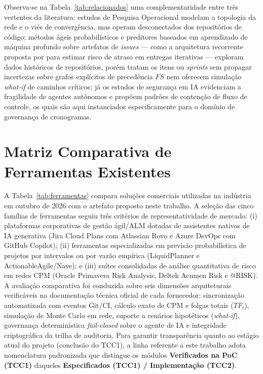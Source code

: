 \documentclass[12pt,openany,oneside,a4paper,english,brazilian,sumario=tradicional]{abntex2}
\begin{document}
Observa-se na Tabela~\ref{tab:relacionados} uma complementaridade entre três vertentes da literatura: estudos de Pesquisa Operacional \cite{clark1961,vanslyke1963,williams1992,hulett2000} modelam a topologia da rede e o viés de convergência, mas operam desconectados dos repositórios de código; métodos ágeis probabilísticos \cite{magennis2011,vacanti2015} e preditores baseados em aprendizado de máquina profundo sobre artefatos de \textit{issues} — como a arquitetura recorrente proposta por  para estimar risco de atraso em entregas iterativas — exploram dados históricos de repositórios, porém tratam os itens ou \textit{sprints} sem propagar incertezas sobre grafos explícitos de precedência $FS$ nem oferecem simulação \textit{what-if} de caminhos críticos; já os estudos de segurança em IA \cite{greshake2023,debenedetti2024,debenedetti2025camel,beurerkellner2025patterns} evidenciam a fragilidade de agentes autônomos e propõem padrões de contenção de fluxo de controle, os quais são aqui instanciados especificamente para o domínio de governança de cronogramas.

\section{Matriz Comparativa de Ferramentas Existentes}

A Tabela~\ref{tab:ferramentas} compara soluções comerciais utilizadas na indústria em outubro de 2026 com o artefato proposto neste trabalho. A seleção das cinco famílias de ferramentas seguiu três critérios de representatividade de mercado: (i) plataformas corporativas de gestão ágil/ALM dotadas de assistentes nativos de IA generativa (Jira Cloud Plans com Atlassian Rovo e Azure DevOps com GitHub Copilot); (ii) ferramentas especializadas em previsão probabilística de projetos por intervalos ou por vazão empírica (LiquidPlanner e ActionableAgile/Nave); e (iii) suítes consolidadas de análise quantitativa de risco em redes CPM (Oracle Primavera Risk Analysis, Deltek Acumen Risk e @RISK). A avaliação comparativa foi conduzida sobre seis dimensões arquiteturais verificáveis na documentação técnica oficial de cada fornecedor: sincronização automatizada com eventos Git/CI, cálculo exato de CPM e folgas totais ($TF_i$), simulação de Monte Carlo em rede, suporte a cenários hipotéticos (\textit{what-if}), governança determinística \textit{fail-closed} sobre o agente de IA e integridade criptográfica da trilha de auditoria. Para garantir transparência quanto ao estágio atual do projeto (conclusão do TCC1), a linha referente a este trabalho adota nomenclatura padronizada que distingue os módulos \textbf{Verificados na PoC (TCC1)} daqueles \textbf{Especificados (TCC1) / Implementação (TCC2)}.
\end{document}
